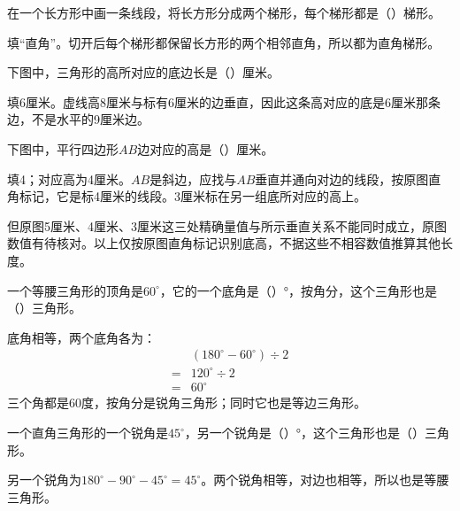 在一个长方形中画一条线段，将长方形分成两个梯形，每个梯形都是（\hspace{1.8em}）梯形。\par
\begin{BookAnswer}
填“直角”。切开后每个梯形都保留长方形的两个相邻直角，所以都为直角梯形。
\end{BookAnswer}

下图中，三角形的高所对应的底边长是（\hspace{1.8em}）厘米。\par
{}
\begin{BookAnswer}
填6厘米。虚线高8厘米与标有6厘米的边垂直，因此这条高对应的底是6厘米那条边，不是水平的9厘米边。
\end{BookAnswer}

下图中，平行四边形\(AB\)边对应的高是（\hspace{1.8em}）厘米。\par
{}
\begin{BookAnswer}
填4；对应高为4厘米。\(AB\)是斜边，应找与\(AB\)垂直并通向对边的线段，按原图直角标记，它是标4厘米的线段。3厘米标在另一组底所对应的高上。\par 但原图5厘米、4厘米、3厘米这三处精确量值与所示垂直关系不能同时成立，原图数值有待核对。以上仅按原图直角标记识别底高，不据这些不相容数值推算其他长度。
\end{BookAnswer}

一个等腰三角形的顶角是\(60^\circ\)，它的一个底角是（\hspace{1.8em}）°，按角分，这个三角形也是（\hspace{1.8em}）三角形。\par
\begin{BookAnswer}
底角相等，两个底角各为：\[\begin{aligned} &(180^\circ-60^\circ)\div2\\={}&120^\circ\div2\\={}&60^\circ\end{aligned}\]三个角都是60度，按角分是锐角三角形；同时它也是等边三角形。
\end{BookAnswer}

一个直角三角形的一个锐角是\(45^\circ\)，另一个锐角是（\hspace{1.8em}）°，这个三角形也是（\hspace{1.8em}）三角形。\par
\begin{BookAnswer}
另一个锐角为\(180^\circ-90^\circ-45^\circ=45^\circ\)。两个锐角相等，对边也相等，所以也是等腰三角形。
\end{BookAnswer}

